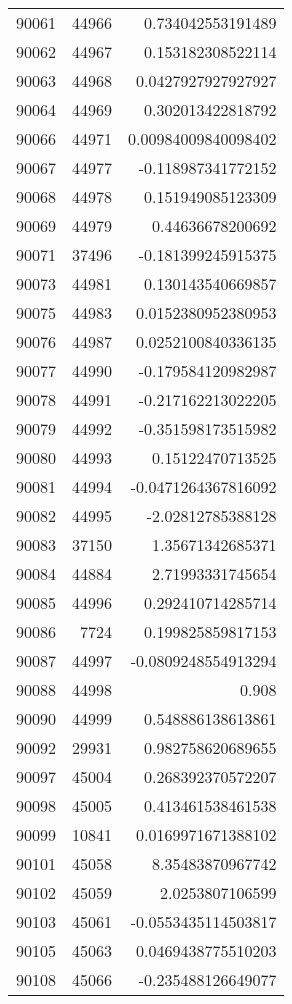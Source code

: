 \begin{tabular}{r | r | r}
90061 & 44966 & 0.734042553191489 \\
90062 & 44967 & 0.153182308522114 \\
90063 & 44968 & 0.0427927927927927 \\
90064 & 44969 & 0.302013422818792 \\
90066 & 44971 & 0.00984009840098402 \\
90067 & 44977 & -0.118987341772152 \\
90068 & 44978 & 0.151949085123309 \\
90069 & 44979 & 0.44636678200692 \\
90071 & 37496 & -0.181399245915375 \\
90073 & 44981 & 0.130143540669857 \\
90075 & 44983 & 0.0152380952380953 \\
90076 & 44987 & 0.0252100840336135 \\
90077 & 44990 & -0.179584120982987 \\
90078 & 44991 & -0.217162213022205 \\
90079 & 44992 & -0.351598173515982 \\
90080 & 44993 & 0.15122470713525 \\
90081 & 44994 & -0.0471264367816092 \\
90082 & 44995 & -2.02812785388128 \\
90083 & 37150 & 1.35671342685371 \\
90084 & 44884 & 2.71993331745654 \\
90085 & 44996 & 0.292410714285714 \\
90086 & 7724 & 0.199825859817153 \\
90087 & 44997 & -0.0809248554913294 \\
90088 & 44998 & 0.908 \\
90090 & 44999 & 0.548886138613861 \\
90092 & 29931 & 0.982758620689655 \\
90097 & 45004 & 0.268392370572207 \\
90098 & 45005 & 0.413461538461538 \\
90099 & 10841 & 0.0169971671388102 \\
90101 & 45058 & 8.35483870967742 \\
90102 & 45059 & 2.0253807106599 \\
90103 & 45061 & -0.0553435114503817 \\
90105 & 45063 & 0.0469438775510203 \\
90108 & 45066 & -0.235488126649077 \\

\end{tabular}
